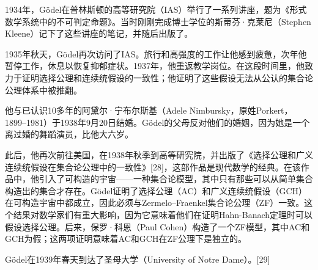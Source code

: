 1934年，Gödel在普林斯顿的高等研究院（IAS）举行了一系列讲座，题为《形式数学系统中的不可判定命题》。当时刚刚完成博士学位的斯蒂芬·克莱尼（Stephen Kleene）记下了这些讲座的笔记，并随后出版了。

1935年秋天，Gödel再次访问了IAS。旅行和高强度的工作让他感到疲惫，次年他暂停工作，休息以恢复抑郁症状。1937年，他重返教学岗位。在这段时间里，他致力于证明选择公理和连续统假设的一致性；他证明了这些假设无法从公认的集合论公理体系中被推翻。

他与已认识10多年的阿黛尔·宁布尔斯基（Adele Nimbursky，原姓Porkert，1899–1981）于1938年9月20日结婚。Gödel的父母反对他们的婚姻，因为她是一个离过婚的舞蹈演员，比他大六岁。

此后，他再次前往美国，在1938年秋季到高等研究院，并出版了《选择公理和广义连续统假设在集合论公理中的一致性》[28]，这部作品是现代数学的经典。在该作品中，他引入了可构造的宇宙——一种集合论模型，其中只有那些可以从简单集合构造出的集合才存在。Gödel证明了选择公理（AC）和广义连续统假设（GCH）在可构造宇宙中都成立，因此必须与Zermelo–Fraenkel集合论公理（ZF）一致。这个结果对数学家们有重大影响，因为它意味着他们在证明Hahn-Banach定理时可以假设选择公理。后来，保罗·科恩（Paul Cohen）构造了一个ZF模型，其中AC和GCH为假；这两项证明意味着AC和GCH在ZF公理下是独立的。

Gödel在1939年春天到达了圣母大学（University of Notre Dame）。[29]

